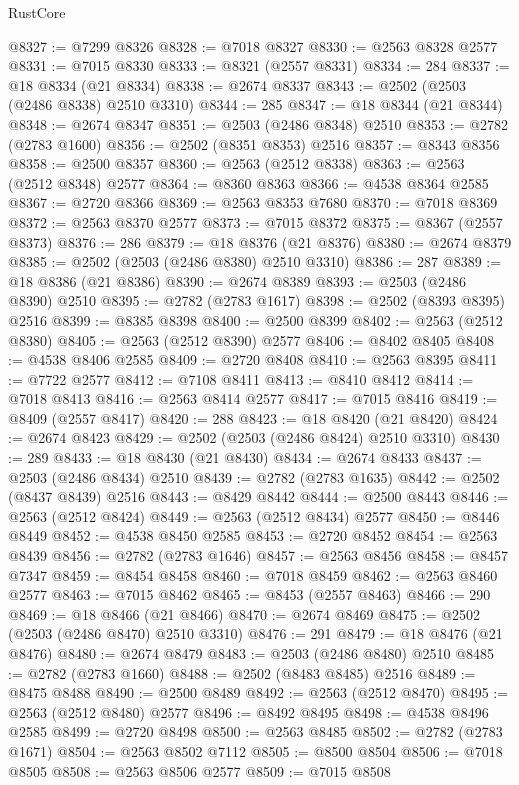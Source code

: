\begin{lexlean}{RustCore}
\begin{coremodule}
@8327 := @7299 @8326
@8328 := @7018 @8327
@8330 := @2563 @8328 @2577
@8331 := @7015 @8330
@8333 := @8321 (@2557 @8331)
@8334 := 284
@8337 := @18 @8334 (@21 @8334)
@8338 := @2674 @8337
@8343 := @2502 (@2503 (@2486 @8338) @2510 @3310)
@8344 := 285
@8347 := @18 @8344 (@21 @8344)
@8348 := @2674 @8347
@8351 := @2503 (@2486 @8348) @2510
@8353 := @2782 (@2783 @1600)
@8356 := @2502 (@8351 @8353) @2516
@8357 := @8343 @8356
@8358 := @2500 @8357
@8360 := @2563 (@2512 @8338)
@8363 := @2563 (@2512 @8348) @2577
@8364 := @8360 @8363
@8366 := @4538 @8364 @2585
@8367 := @2720 @8366
@8369 := @2563 @8353 @7680
@8370 := @7018 @8369
@8372 := @2563 @8370 @2577
@8373 := @7015 @8372
@8375 := @8367 (@2557 @8373)
@8376 := 286
@8379 := @18 @8376 (@21 @8376)
@8380 := @2674 @8379
@8385 := @2502 (@2503 (@2486 @8380) @2510 @3310)
@8386 := 287
@8389 := @18 @8386 (@21 @8386)
@8390 := @2674 @8389
@8393 := @2503 (@2486 @8390) @2510
@8395 := @2782 (@2783 @1617)
@8398 := @2502 (@8393 @8395) @2516
@8399 := @8385 @8398
@8400 := @2500 @8399
@8402 := @2563 (@2512 @8380)
@8405 := @2563 (@2512 @8390) @2577
@8406 := @8402 @8405
@8408 := @4538 @8406 @2585
@8409 := @2720 @8408
@8410 := @2563 @8395
@8411 := @7722 @2577
@8412 := @7108 @8411
@8413 := @8410 @8412
@8414 := @7018 @8413
@8416 := @2563 @8414 @2577
@8417 := @7015 @8416
@8419 := @8409 (@2557 @8417)
@8420 := 288
@8423 := @18 @8420 (@21 @8420)
@8424 := @2674 @8423
@8429 := @2502 (@2503 (@2486 @8424) @2510 @3310)
@8430 := 289
@8433 := @18 @8430 (@21 @8430)
@8434 := @2674 @8433
@8437 := @2503 (@2486 @8434) @2510
@8439 := @2782 (@2783 @1635)
@8442 := @2502 (@8437 @8439) @2516
@8443 := @8429 @8442
@8444 := @2500 @8443
@8446 := @2563 (@2512 @8424)
@8449 := @2563 (@2512 @8434) @2577
@8450 := @8446 @8449
@8452 := @4538 @8450 @2585
@8453 := @2720 @8452
@8454 := @2563 @8439
@8456 := @2782 (@2783 @1646)
@8457 := @2563 @8456
@8458 := @8457 @7347
@8459 := @8454 @8458
@8460 := @7018 @8459
@8462 := @2563 @8460 @2577
@8463 := @7015 @8462
@8465 := @8453 (@2557 @8463)
@8466 := 290
@8469 := @18 @8466 (@21 @8466)
@8470 := @2674 @8469
@8475 := @2502 (@2503 (@2486 @8470) @2510 @3310)
@8476 := 291
@8479 := @18 @8476 (@21 @8476)
@8480 := @2674 @8479
@8483 := @2503 (@2486 @8480) @2510
@8485 := @2782 (@2783 @1660)
@8488 := @2502 (@8483 @8485) @2516
@8489 := @8475 @8488
@8490 := @2500 @8489
@8492 := @2563 (@2512 @8470)
@8495 := @2563 (@2512 @8480) @2577
@8496 := @8492 @8495
@8498 := @4538 @8496 @2585
@8499 := @2720 @8498
@8500 := @2563 @8485
@8502 := @2782 (@2783 @1671)
@8504 := @2563 @8502 @7112
@8505 := @8500 @8504
@8506 := @7018 @8505
@8508 := @2563 @8506 @2577
@8509 := @7015 @8508

\end{coremodule}
\end{lexlean}
